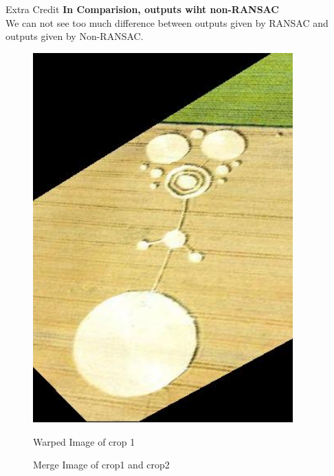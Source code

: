 \documentclass[a4paper,12pt]{article}
\begin{document}
\begin{section}{Extra Credit}
\clearpage
\textbf{In Comparision, outputs wiht non-RANSAC}\\
We can not see too much difference between outputs given by RANSAC and outputs given by Non-RANSAC.\\

 \begin{figure}[!htb]
       \center
       {\includegraphics[width=10cm]
       {crop_warp.png}}
        \caption{Warped Image of crop 1}
      \end{figure}



\begin{figure}[!htb]
        \caption{Merge Image of crop1 and crop2}
      \end{figure}
      


\end{section}
\end{document}
